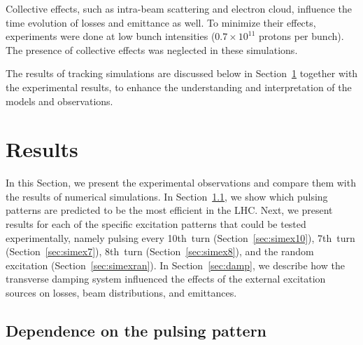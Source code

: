 \documentclass[
prstab
,reprint
,linenumbers
,longbibliography
,preprintnumbers
,showkeys
,amsfonts,amssymb,amsmath
,floatfix
]{revtex4-1}
\begin{document}
Collective effects, such as intra-beam scattering and electron cloud,
influence the time evolution of losses and emittance as well. To
minimize their effects, experiments were done at low bunch intensities
($0.7 \times 10^{11}$ protons per bunch). The presence of collective
effects was neglected in these simulations.

The results of tracking simulations are discussed below in
Section~\ref{sec:simex} together with the experimental results, to
enhance the understanding and interpretation of the models and
observations.



\section{Results}
\label{sec:simex}

In this Section, we present the experimental observations and compare
them with the results of numerical simulations.  In
Section~\ref{sec:pattern}, we show which pulsing patterns are
predicted to be the most efficient in the LHC.  Next, we present
results for each of the specific excitation patterns that could be
tested experimentally, namely pulsing every 10th~turn
(Section~\ref{sec:simex10}), 7th~turn (Section~\ref{sec:simex7}),
8th~turn (Section~\ref{sec:simex8}), and the random excitation
(Section~\ref{sec:simexran}).  In Section~\ref{sec:damp}, we describe
how the transverse damping system influenced the effects of the
external excitation sources on losses, beam distributions, and
emittances.


\subsection{Dependence on the pulsing pattern}
\label{sec:pattern}
\end{document}
